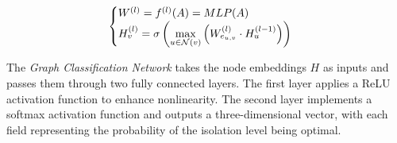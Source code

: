 {\begin{equation}
    \setlength\abovedisplayskip{3pt}
    \setlength\belowdisplayskip{3pt}
    \begin{cases}
    W^{(l)} = f^{(l)}(A) = MLP(A) \\
    H^{(l)}_v = \sigma \left( \underset{u \in \mathcal{N}(v)}{\max} \left( W^{(l)}_{e_{u,v}} \cdot H_u^{(l-1)} \right) \right)
    \end{cases}
    \label{eq: gnn}
\end{equation} 

The \textit{Graph Classification Network} takes the node embeddings $H$ as inputs and passes them through two fully connected layers. The first layer applies a ReLU activation function to enhance nonlinearity. The second layer implements a softmax activation function and outputs a three-dimensional vector, with each field representing the probability of the isolation level being optimal.
}





